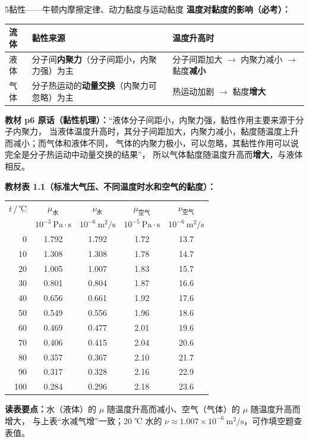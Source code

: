 \begin{kaodian}{5}{黏性——牛顿内摩擦定律、动力黏度与运动黏度}
\textbf{温度对黏度的影响（必考）：}
\begin{center}
\begin{tabularx}{\textwidth}{@{}lXX@{}}
\toprule
流体 & 黏性来源 & 温度升高时 \\
\midrule
液体 & 分子间\textbf{内聚力}（分子间距小，内聚力强）为主 & 分子间距加大 $\to$ 内聚力减小 $\to$ 黏度\textbf{减小} \\
气体 & 分子热运动的\textbf{动量交换}（内聚力可忽略）为主 & 热运动加剧 $\to$ 黏度\textbf{增大} \\
\bottomrule
\end{tabularx}
\end{center}

\textbf{教材 p6 原话（黏性机理）：}“液体分子间距小，内聚力强，黏性作用主要来源于分子内聚力，
当液体温度升高时，其分子间距加大，内聚力减小，黏度随温度上升而减小；而气体和液体不同，
气体的内聚力极小，可以忽略，其黏性作用可以说完全是分子热运动中动量交换的结果”，
所以气体黏度随温度升高而\textbf{增大}，与液体相反。

\textbf{教材表 1.1（标准大气压、不同温度时水和空气的黏度）：}
\begin{center}
\begin{tabular}{@{}rcccc@{}}
\toprule
$t$\,/\,℃ & $\mu_{\text{水}}$ & $\nu_{\text{水}}$ & $\mu_{\text{空气}}$ & $\nu_{\text{空气}}$ \\
 & $10^{-3}\ \mathrm{Pa\cdot s}$ & $10^{-6}\ \mathrm{m^2/s}$ & $10^{-5}\ \mathrm{Pa\cdot s}$ & $10^{-6}\ \mathrm{m^2/s}$ \\
\midrule
0 & 1.792 & 1.792 & 1.72 & 13.7 \\
10 & 1.308 & 1.308 & 1.78 & 14.7 \\
20 & 1.005 & 1.007 & 1.83 & 15.7 \\
30 & 0.801 & 0.804 & 1.87 & 16.6 \\
40 & 0.656 & 0.661 & 1.92 & 17.6 \\
50 & 0.549 & 0.556 & 1.96 & 18.6 \\
60 & 0.469 & 0.477 & 2.01 & 19.6 \\
70 & 0.406 & 0.415 & 2.04 & 20.6 \\
80 & 0.357 & 0.367 & 2.10 & 21.7 \\
90 & 0.317 & 0.328 & 2.16 & 22.9 \\
100 & 0.284 & 0.296 & 2.18 & 23.6 \\
\bottomrule
\end{tabular}
\end{center}
\textbf{读表要点：}水（液体）的 $\mu$ 随温度升高而减小、空气（气体）的 $\mu$ 随温度升高而增大，
与上表“水减气增”一致；20 ℃ 水的 $\nu\approx1.007\times10^{-6}\ \mathrm{m^2/s}$，可作填空题查表值。


\end{kaodian}
